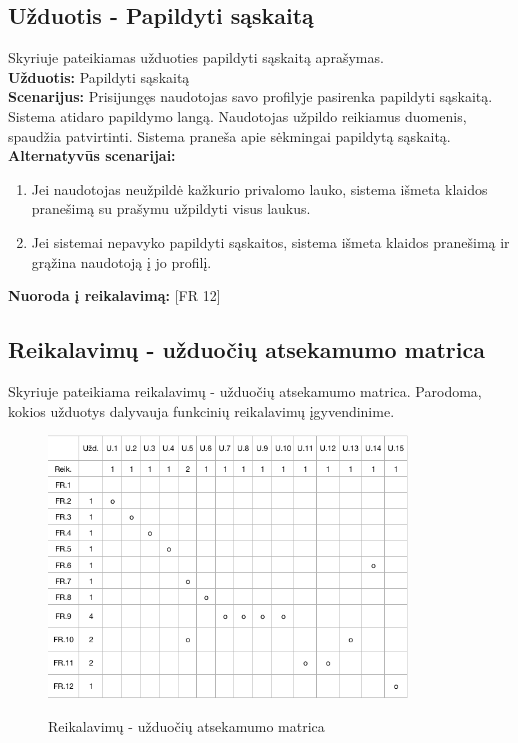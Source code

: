 \documentclass{VUMIFPSkursinis}
\begin{document}
	\subsection{Užduotis - Papildyti sąskaitą}
	Skyriuje pateikiamas užduoties papildyti sąskaitą aprašymas.\\
	\textbf{Užduotis:}  Papildyti sąskaitą \\
	\textbf{Scenarijus:}  Prisijungęs naudotojas savo profilyje pasirenka papildyti sąskaitą. Sistema atidaro papildymo langą. Naudotojas užpildo reikiamus duomenis, spaudžia patvirtinti. Sistema praneša apie sėkmingai papildytą sąskaitą.  \\
	\textbf{Alternatyvūs scenarijai:}
	\begin{enumerate}
		\item Jei naudotojas neužpildė kažkurio privalomo lauko, sistema išmeta klaidos pranešimą su prašymu užpildyti visus laukus.
		\item Jei sistemai nepavyko papildyti sąskaitos, sistema išmeta klaidos pranešimą ir grąžina naudotoją į jo profilį.
	\end{enumerate}
	\textbf{Nuoroda į reikalavimą: } [FR 12]

	\subsection{Reikalavimų - užduočių atsekamumo matrica}
	Skyriuje pateikiama reikalavimų - užduočių atsekamumo matrica. Parodoma, kokios užduotys dalyvauja funkcinių reikalavimų įgyvendinime.\\
	\begin{figure}[H]
		\centering
		\includegraphics[width=0.85\textwidth]{img/matrix.png}
		\label{fig:matrix}
		\caption{Reikalavimų - užduočių atsekamumo matrica}
	\end{figure}
\end{document}
